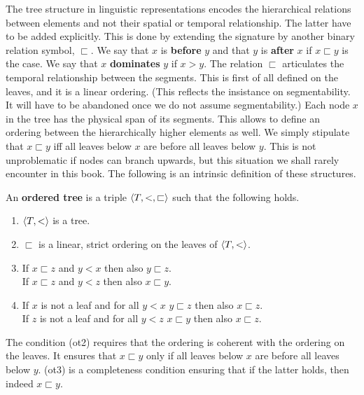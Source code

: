 The tree structure in linguistic representations encodes
the hierarchical relations between elements and not their
spatial or temporal relationship. The latter have to be
added explicitly.  This is done by extending the signature
\index{$\sqsubset$}%
by another binary relation symbol, $\sqsubset$. We say that
$x$ is \textbf{before} $y$ and that $y$ is \textbf{after} $x$ if
$x \sqsubset y$ is the case. We say that $x$ \textbf{dominates}
$y$ if $x > y$.
The relation $\sqsubset$ articulates the temporal relationship
between the segments. This is first of all defined on the leaves,
and it is a linear ordering. (This reflects the insistance on
segmentability. It will have to be abandoned once we do not
assume segmentability.) Each node $x$ in the tree has the
physical span of its segments. This allows to define an
ordering between the hierarchically higher elements as well.
We simply stipulate that $x \sqsubset y$ iff all
leaves below $x$ are before all leaves below $y$. This is not
unproblematic if nodes can branch upwards, but this situation
we shall rarely encounter in this book.
The following is an intrinsic definition of these structures.
\begin{defn}
An \textbf{ordered tree} is a triple $\langle T, <, \sqsubset\rangle$
such that the following holds.
\renewcommand{\labelenumi}{\mbox{\rm (ot\arabic{enumi})}}
\begin{enumerate}
\item $\langle T, <\rangle$ is a tree.
\item $\sqsubset$ is a linear, strict ordering on
    the leaves of $\langle T,<\rangle$.
\item If $x \sqsubset z$ and $y < x$ then also $y \sqsubset z$.
    \\
     If $x \sqsubset z$ and $y < z$ then also $x \sqsubset y$.
    \\
\item If $x$ is not a leaf and for all $y < x$
    $y \sqsubset z$ then also $x \sqsubset z$. \\
    If $z$ is not a leaf and for all $y < z$ $x \sqsubset y$
        then also $x \sqsubset z$.
\end{enumerate}
\renewcommand{\labelenumi}{\alph{enumi}.}
\end{defn}
The condition (ot2) requires that the ordering is coherent
with the ordering on the leaves. It ensures that $x \sqsubset y$
only if all leaves below $x$ are before all leaves below $y$.
(ot3) is a completeness condition ensuring that if the latter
holds, then indeed $x \sqsubset y$.

